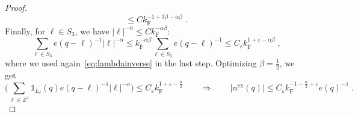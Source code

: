 \documentclass[12pt,a4paper]{article}
\numberwithin{equation}{section}
\newcommand{\1}{\mathbb{I}}
\newcommand{\ex}{\mathrm{ex}}
\newcommand{\F}{\mathrm{F}}
\newcommand{\Zstar}{\mathbb{Z}^3} %
\newcommand{\Z}{\mathbb{Z}}
\theoremstyle{plain}
\theoremstyle{definition}
\theoremstyle{remark}
\theoremstyle{plain}
\theoremstyle{definition}
\theoremstyle{remark}
\begin{document}
\begin{proof}
\begin{equation}
	\le C k_{\F}^{-1 + 3 \beta - \alpha \beta} \;.
\end{equation}
Finally, for $ \ell \in S_3 $, we have $ |\ell|^{-\alpha} \le C k_{\F}^{-\alpha \beta} $:
\begin{equation}
	\sum_{\ell \in S_3} e(q-\ell)^{-1} |\ell|^{-\alpha}
	\le k_{\F}^{-\alpha \beta} \sum_{\ell \in S_3} e(q-\ell)^{-1}
	\le C_\varepsilon k_{\F}^{1 + \varepsilon - \alpha \beta} \;,
\end{equation}
where we used again~\eqref{eq:lambdainverse} in the last step. Optimizing $ \beta = \frac 12 $, we get
\begin{equation}
	\Bigg( \sum_{\ell \in \Zstar} \mathds{1}_{L_\ell}(q) e(q-\ell)^{-1} |\ell|^{-\alpha} \Bigg)
	\le C_\varepsilon k_{\F}^{1 + \varepsilon - \frac{\alpha}{2}} \qquad \Rightarrow \qquad
	|n^{\ex}(q)|
	\leq C_\varepsilon k_{\F}^{-1 - \frac{\alpha}{2} + \varepsilon} e(q)^{-1} \;.
\end{equation}


\end{proof}
\end{document}
